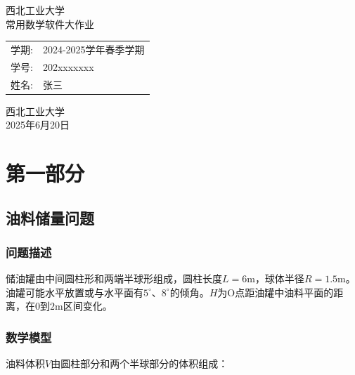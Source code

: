 \documentclass[fontset=windows,openright]{ctexrep}
\newcommand{\mytitle}{西北工业大学\\常用数学软件大作业}
\begin{document}
{
    \thispagestyle{empty}
    \vspace*{2cm}
    \begin{center}
         \heiti \mytitle
    \end{center}

    \vfill

    \heiti {}

    \begin{center}
        \renewcommand{\arraystretch}{2} %
        \begin{tabular}{cw{c}{5cm}}           
            学期: & { 2024-2025学年春季学期}  \\ 
            学号: & {  202xxxxxxx}  \\ 
            姓名: & {  张三}  \\ 
        \end{tabular}
    \end{center}
    \vspace{3cm}
    \begin{center}
        西北工业大学 \\
        2025年6月20日
    \end{center}
}
\newpage   


\newpage %
\cleardoublepage

    \setcounter{page}{1}

\chapter{第一部分} \label{section:introduction}
\section{油料储量问题}

\subsection{问题描述}
储油罐由中间圆柱形和两端半球形组成，圆柱长度$L=6\text{m}$，球体半径$R=1.5\text{m}$。油罐可能水平放置或与水平面有$5^\circ$、$8^\circ$的倾角。$H$为O点距油罐中油料平面的距离，在$0$到$2\text{m}$区间变化。

\subsection{数学模型}
油料体积$V$由圆柱部分和两个半球部分的体积组成：
\end{document}
